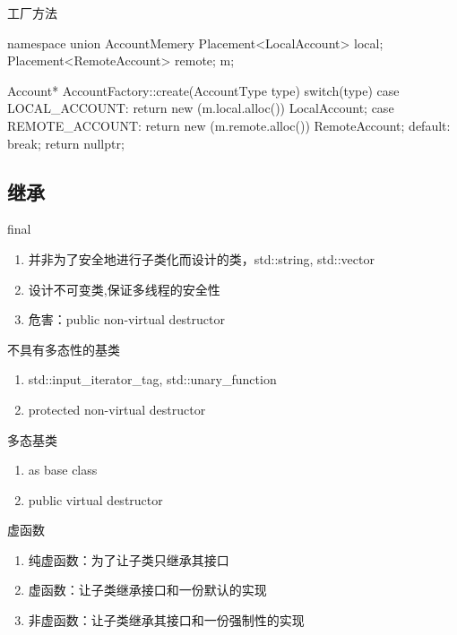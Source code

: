 \begin{frame}[fragile]{工厂方法}
\begin{c++}
namespace {
  union AccountMemery {
    Placement<LocalAccount>  local;
    Placement<RemoteAccount> remote;
  } m;
}

Account* AccountFactory::create(AccountType type) {
  switch(type) {
    case LOCAL_ACCOUNT: 
      return new (m.local.alloc()) LocalAccount;
    case REMOTE_ACCOUNT: 
      return new (m.remote.alloc()) RemoteAccount;
    default: break;
  }
  return nullptr;
}
\end{c++}
\end{frame}

\subsection{继承}

\begin{frame}[fragile]{final}
\begin{enumerate}
  \item 并非为了安全地进行子类化而设计的类，std::string, std::vector
  \item 设计不可变类,保证多线程的安全性
  \item 危害：public non-virtual destructor  
\end{enumerate}
\end{frame}

\begin{frame}[fragile]{不具有多态性的基类}
\begin{enumerate}
  \item std::input\_iterator\_tag, std::unary\_function
  \item protected non-virtual destructor
\end{enumerate}
\end{frame}

\begin{frame}[fragile]{多态基类}
\begin{enumerate}
  \item as base class
  \item public virtual destructor
\end{enumerate}
\end{frame}

\begin{frame}[fragile]{虚函数}
\begin{enumerate}
  \item 纯虚函数：为了让子类只继承其接口
  \item 虚函数：让子类继承接口和一份默认的实现
  \item 非虚函数：让子类继承其接口和一份强制性的实现
\end{enumerate}
\end{frame}

